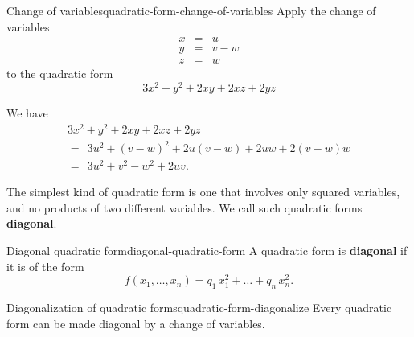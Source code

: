 \begin{example}{Change of variables}{quadratic-form-change-of-variables}
  Apply the change of variables
  \begin{eqnarray*}
    x &=& u \\
    y &=& v-w \\
    z &=& w
  \end{eqnarray*}
  to the quadratic form
  \begin{equation*}
    3x^2 + y^2 + 2xy + 2xz + 2yz
  \end{equation*}
\end{example}

\begin{solution}
  We have
  \begin{equation*}
    \begin{array}{l}
      3x^2 + y^2 + 2xy + 2xz + 2yz \\
      =~~ 3u^2 + (v-w)^2 + 2u(v-w) + 2uw + 2(v-w)w \\
      =~~ 3u^2 + v^2 - w^2 + 2uv.
    \end{array}
  \end{equation*}
\end{solution}

The simplest kind of quadratic form is one that involves only squared
variables, and no products of two different variables. We call such
quadratic forms \textbf{diagonal}.

\begin{definition}{Diagonal quadratic form}{diagonal-quadratic-form}
  A quadratic form is \textbf{diagonal}%
   if it is of the form
  \begin{equation*}
    f(x_1,\ldots,x_n) = q_1\,x_1^2 + \ldots + q_n\,x_n^2.
  \end{equation*}
\end{definition}

\begin{proposition}{Diagonalization of quadratic forms}{quadratic-form-diagonalize}
  Every quadratic form can be made diagonal by a change of variables.
\end{proposition}

